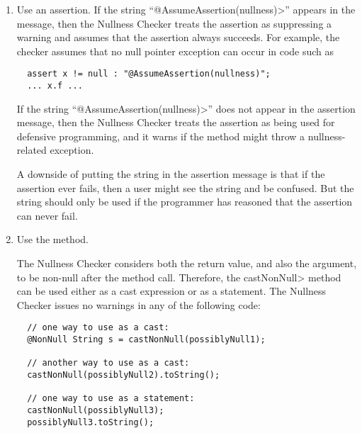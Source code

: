 \begin{enumerate}
\item
  Use an assertion.  If the string ``\<@AssumeAssertion(nullness)>''
  appears in the message, then the Nullness Checker treats the
  assertion as suppressing a warning and assumes that the assertion always
  succeeds.  For example, the checker assumes that no null pointer
  exception can occur in code such as
\begin{Verbatim}
  assert x != null : "@AssumeAssertion(nullness)";
  ... x.f ...
\end{Verbatim}

  If the string ``\<@AssumeAssertion(nullness)>'' does not appear in the
  assertion message, then the Nullness Checker treats the assertion as being
  used for defensive programming, and it warns if the method might throw a
  nullness-related exception.

  A downside of putting the string in the assertion message is that if the
  assertion ever fails, then a user might see the string and be confused.
  But the string should only be used if the programmer has reasoned that
  the assertion can never fail.



\item
  Use the  method.

The Nullness
 Checker considers both the return value, and also the argument, to
 be non-null after the method call.  Therefore, the
 \<castNonNull> method can be used either as a cast expression or
 as a statement.  The Nullness Checker issues no warnings in any of
the following code:

\begin{Verbatim}
  // one way to use as a cast:
  @NonNull String s = castNonNull(possiblyNull1);

  // another way to use as a cast:
  castNonNull(possiblyNull2).toString();

  // one way to use as a statement:
  castNonNull(possiblyNull3);
  possiblyNull3.toString();
\end{Verbatim}


\end{enumerate}
